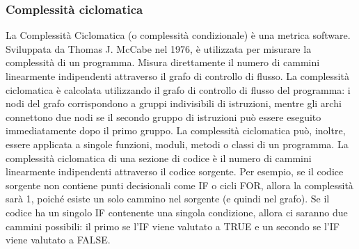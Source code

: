 \subsubsection{Complessità ciclomatica}
La Complessità Ciclomatica (o complessità condizionale) è una metrica software. Sviluppata da Thomas J. McCabe nel 1976, è utilizzata per misurare la complessità di un programma. Misura direttamente il numero di cammini linearmente indipendenti attraverso il grafo di controllo di flusso.
La complessità ciclomatica è calcolata utilizzando il grafo di controllo di flusso del programma: i nodi del grafo corrispondono a gruppi indivisibili di istruzioni, mentre gli archi connettono due nodi se il secondo gruppo di istruzioni può essere eseguito immediatamente dopo il primo gruppo. La complessità ciclomatica può, inoltre, essere applicata a singole funzioni, moduli, metodi o classi di un programma.
La complessità ciclomatica di una sezione di codice è il numero di cammini linearmente indipendenti attraverso il codice sorgente. Per esempio, se il codice sorgente non contiene punti decisionali come IF o cicli FOR, allora la complessità sarà 1, poiché esiste un solo cammino nel sorgente (e quindi nel grafo). Se il codice ha un singolo IF contenente una singola condizione, allora ci saranno due cammini possibili: il primo se l'IF viene valutato a TRUE e un secondo se l'IF viene valutato a FALSE.

